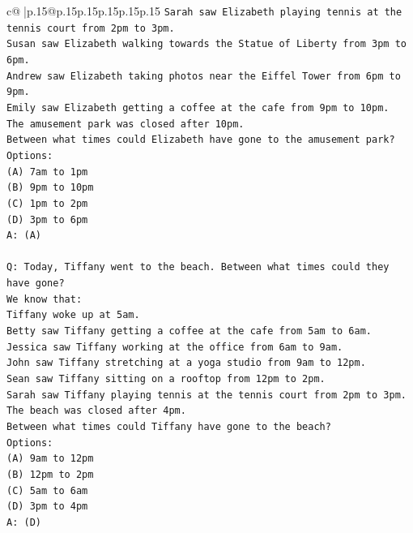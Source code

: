 \documentclass{article}
\begin{document}
{\begin{supertabular}{c@{$\;$}|p{.15\linewidth}@{}p{.15\linewidth}p{.15\linewidth}p{.15\linewidth}p{.15\linewidth}p{.15\linewidth}}
{{{\texttt{Sarah saw Elizabeth playing tennis at the tennis court from 2pm to 3pm.} \\
\texttt{Susan saw Elizabeth walking towards the Statue of Liberty from 3pm to 6pm.} \\
\texttt{Andrew saw Elizabeth taking photos near the Eiffel Tower from 6pm to 9pm.} \\
\texttt{Emily saw Elizabeth getting a coffee at the cafe from 9pm to 10pm.} \\
\texttt{The amusement park was closed after 10pm.} \\
\texttt{Between what times could Elizabeth have gone to the amusement park?} \\
\texttt{Options:} \\
\texttt{(A) 7am to 1pm} \\
\texttt{(B) 9pm to 10pm} \\
\texttt{(C) 1pm to 2pm} \\
\texttt{(D) 3pm to 6pm} \\
\texttt{A: (A)} \\
\\ 
\texttt{Q: Today, Tiffany went to the beach. Between what times could they have gone?} \\
\texttt{We know that:} \\
\texttt{Tiffany woke up at 5am.} \\
\texttt{Betty saw Tiffany getting a coffee at the cafe from 5am to 6am.} \\
\texttt{Jessica saw Tiffany working at the office from 6am to 9am.} \\
\texttt{John saw Tiffany stretching at a yoga studio from 9am to 12pm.} \\
\texttt{Sean saw Tiffany sitting on a rooftop from 12pm to 2pm.} \\
\texttt{Sarah saw Tiffany playing tennis at the tennis court from 2pm to 3pm.} \\
\texttt{The beach was closed after 4pm.} \\
\texttt{Between what times could Tiffany have gone to the beach?} \\
\texttt{Options:} \\
\texttt{(A) 9am to 12pm} \\
\texttt{(B) 12pm to 2pm} \\
\texttt{(C) 5am to 6am} \\
\texttt{(D) 3pm to 4pm} \\
\texttt{A: (D)} \\
\\ 
}}}
\end{supertabular}}
\end{document}
